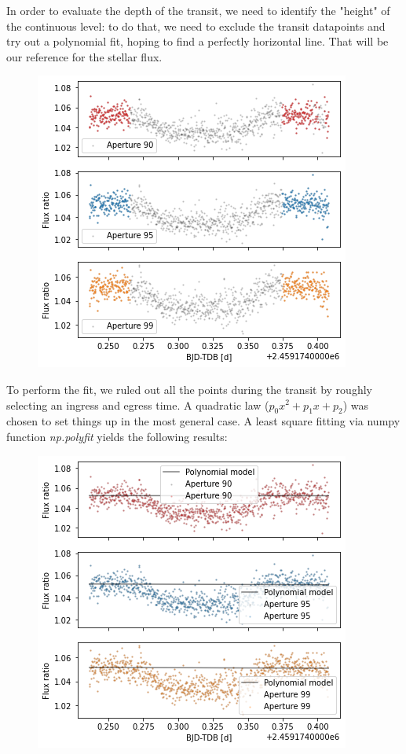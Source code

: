 \documentclass[a4paper,11pt,twocolumn]{article}
\begin{document}
In order to evaluate the depth of the transit, we need to identify the "height" 
of the continuous level: to do that, we need to exclude the transit datapoints 
and try out a polynomial fit, hoping to find a perfectly horizontal line. That will 
be our reference for the stellar flux.
\begin{figure}[H]
    \centering  
    \includegraphics[scale=0.45, angle=0]{../pictures/taste/fit_setting.png}
\end{figure}
To perform the fit, we ruled out all the points during the transit by roughly 
selecting an ingress and egress time. A quadratic law ($p_0 x^2 + p_1 x +p_2$)
was chosen to set things up in the most general case. A least square fitting 
via numpy function \textit{np.polyfit} yields the following results:
\begin{figure}[H]
    \centering  
    \includegraphics[scale=0.45, angle=0]{../pictures/taste/fit.png}
\end{figure}
\end{document}
